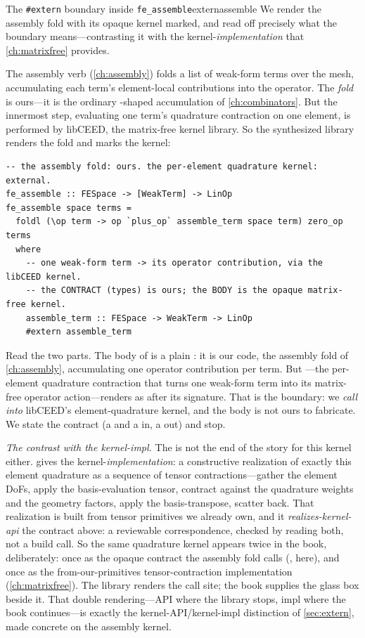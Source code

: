 \begin{workedexample}{The \texttt{\#extern} boundary inside \texttt{fe\_assemble}}{externassemble}
We render the assembly fold with its opaque kernel marked, and read off precisely
what the boundary means---contrasting it with the kernel-\emph{implementation} that
\cref{ch:matrixfree} provides.

The assembly verb  (\cref{ch:assembly}) folds a list of
weak-form terms over the mesh, accumulating each term's element-local contributions
into the operator. The \emph{fold} is ours---it is the ordinary
-shaped accumulation of \cref{ch:combinators}. But the
innermost step, evaluating one term's quadrature contraction on one element, is
performed by libCEED, the matrix-free kernel library. So the synthesized library
renders the fold and marks the kernel:
\begin{lstlisting}[style=l4style]
-- the assembly fold: ours. the per-element quadrature kernel: external.
fe_assemble :: FESpace -> [WeakTerm] -> LinOp
fe_assemble space terms =
  foldl (\op term -> op `plus_op` assemble_term space term) zero_op terms
  where
    -- one weak-form term -> its operator contribution, via the libCEED kernel.
    -- the CONTRACT (types) is ours; the BODY is the opaque matrix-free kernel.
    assemble_term :: FESpace -> WeakTerm -> LinOp
    #extern assemble_term
\end{lstlisting}
Read the two parts. The body of  is a plain : it is
our code, the assembly fold of \cref{ch:assembly}, accumulating one operator
contribution per term. But ---the per-element quadrature
contraction that turns one weak-form term into its matrix-free operator
action---renders as  after its signature. That is the boundary: we
\emph{call into} libCEED's element-quadrature kernel, and the body is not ours to
fabricate. We state the contract (a  and a  in, a
 out) and stop.

\emph{The contrast with the kernel-impl.} The  is not the end of the
story for this kernel either.  gives the
kernel-\emph{implementation}: a constructive realization of exactly this element
quadrature as a sequence of tensor contractions---gather the element DoFs, apply the
basis-evaluation tensor, contract against the quadrature weights and the geometry
factors, apply the basis-transpose, scatter back. That realization is built from
tensor primitives we already own, and it \emph{realizes-kernel-api} the
 contract above: a reviewable correspondence, checked
by reading both, not a build call. So the same quadrature kernel appears twice in the
book, deliberately: once as the opaque contract the assembly fold calls
(, here), and once as the from-our-primitives tensor-contraction
implementation (\cref{ch:matrixfree}). The library renders the call site; the book
supplies the glass box beside it. That double rendering---API where the library
stops, impl where the book continues---is exactly the kernel-API/kernel-impl
distinction of \cref{sec:extern}, made concrete on the assembly kernel.
\end{workedexample}

